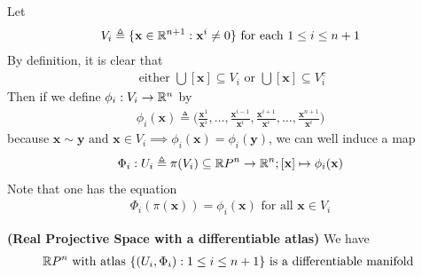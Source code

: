 \documentclass{report}
\begin{document}
\begin{mdframed}
Let 
\begin{align*}
V_i\triangleq \{ \textbf{x}\in\mathbb{R}^{n+1}:\textbf{x}^i \neq 0 \}\text{ for each }1\leq i\leq n+1
\end{align*}
By definition, it is clear that 
\begin{align*}
\text{ either }\bigcup [\textbf{x}]\subseteq V_i\text{ or }\bigcup [\textbf{x}]\subseteq V_i^c
\end{align*}
Then if we define $\phi_i:V_i\rightarrow \mathbb{R}^n$ by
\begin{align*}
\phi_i(\textbf{x})\triangleq \Big(\frac{\textbf{x}^1}{\textbf{x}^i},\dots ,\frac{\textbf{x}^{i-1}}{\textbf{x}^i},\frac{\textbf{x}^{i+1}}{\textbf{x}^i},\dots,\frac{\textbf{x}^{n+1}}{\textbf{x}^i} \Big)
\end{align*}
because $\textbf{x}\sim \textbf{y}\text{ and }\textbf{x}\in V_i\implies \phi_i(\textbf{x})=\phi_i(\textbf{y})$, we can well induce a map 
\begin{align*}
\Phi_i:U_i\triangleq \pi (V_i)\subseteq \mathbb{R} P^n\rightarrow \mathbb{R}^n; [\textbf{x}]\mapsto \phi_i(\textbf{x})
\end{align*}
Note that one has the equation 
\begin{align*}
\Phi_i(\pi (\textbf{x}))= \phi_i(\textbf{x})\text{ for all }\textbf{x}\in V_i
\end{align*}
\end{mdframed}
\begin{theorem}
\textbf{(Real Projective Space with a differentiable atlas)} We have
\begin{align*}
  \mathbb{R} P^n\text{ with atlas }\{ (U_i,\Phi_i):1\leq i\leq n+1 \}\text{ is a differentiable manifold }
\end{align*}
\end{theorem}
\end{document}
